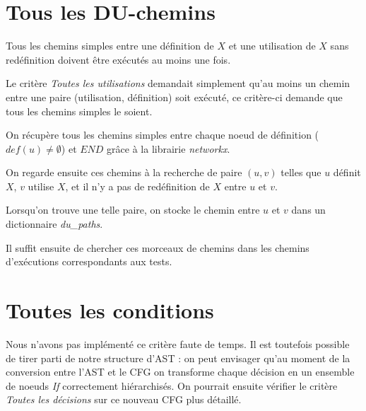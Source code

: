 \section{Tous les DU-chemins}

Tous les chemins simples entre une définition de $X$ et une utilisation de $X$ sans redéfinition doivent être exécutés au moins une fois.

Le critère \textit{Toutes les utilisations} demandait simplement qu'au moins un chemin entre une paire (utilisation, définition) soit exécuté, ce critère-ci demande que tous les chemins simples le soient.

On récupère tous les chemins simples entre chaque noeud de définition ($def(u) \neq \emptyset$) et $END$ grâce à la librairie \textit{networkx}.

On regarde ensuite ces chemins à la recherche de paire $(u, v)$ telles que $u$ définit $X$, $v$ utilise $X$, et il n'y a pas de redéfinition de $X$ entre $u$ et $v$.

Lorsqu'on trouve une telle paire, on stocke le chemin entre $u$ et $v$ dans un dictionnaire \textit{du\_paths}.

Il suffit ensuite de chercher ces morceaux de chemins dans les chemins d'exécutions correspondants aux tests.

\section{Toutes les conditions}

Nous n'avons pas implémenté ce critère faute de temps. Il est toutefois possible de tirer parti de notre structure d'AST : on peut envisager qu'au moment de la conversion entre l'AST et le CFG on transforme chaque décision en un ensemble de noeuds \textit{If} correctement hiérarchisés. On pourrait ensuite vérifier le critère \textit{Toutes les décisions} sur ce nouveau CFG plus détaillé.